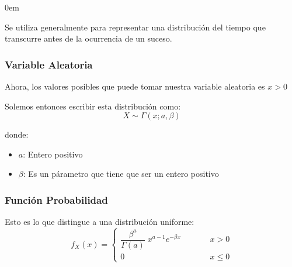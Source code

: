 \documentclass[12pt, fleqn]{report}                             %
\newenvironment{SmallIndentation}[1][0.75em]                    %
        {\begin{adjustwidth}{#1}{}\begin{footnotesize}}             %
        {\end{footnotesize}\end{adjustwidth}}                       %
\DeclareMathOperator \MegaSpace {\quad \quad}                   %
\theoremstyle{break}                                            %
\begin{document}
\begin{multicols}{2}
\begin{SmallIndentation}[0em]
                        Se utiliza generalmente para representar una distribución del tiempo
                        que transcurre antes de la ocurrencia de un suceso.


                        \vspace{1em}
                        \subsubsection{Variable Aleatoria}

                            Ahora, los valores posibles que puede tomar nuestra variable aleatoria es
                            $x > 0$

                            Solemos entonces escribir esta distribución como:
                            \begin{equation*}
                                X \sim \Gamma(x; a, \beta)
                            \end{equation*}

                            donde:
                            \begin{itemize}
                                \item $a$: Entero positivo
                                \item $\beta$: Es un párametro que tiene que ser un entero positivo
                            \end{itemize}
              
                    \subsubsection{Función Probabilidad}

                        Esto es lo que distingue a una distribución uniforme:
                        \begin{equation*}
                            f_X(x) = 
                                \begin{cases}
                                    \dfrac{\beta^a}{\Gamma(a)} \; x^{a - 1} e^{-\beta x}    \MegaSpace & x > 0           \\
                                    0                                                       \MegaSpace & x \leq 0
                                \end{cases}
                        \end{equation*}



\end{SmallIndentation}
\end{multicols}
\end{document}
